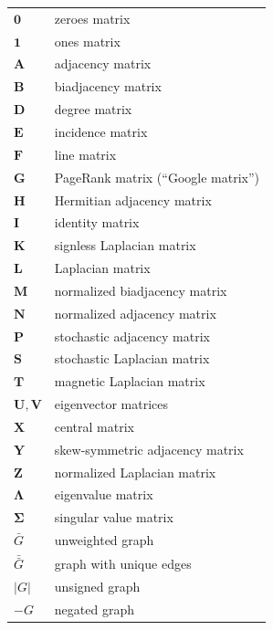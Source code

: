 \documentclass{article}
\begin{document}
\begin{longtable}{ll}
  $\mathbf 0$ & zeroes matrix \\
  $\mathbf 1$ & ones matrix \\
  $\mathbf A$ & adjacency matrix \\
  $\mathbf B$ & biadjacency matrix \\
  $\mathbf D$ & degree matrix \\
  $\mathbf E$ & incidence matrix \\ 
  $\mathbf F$ & line matrix \\
  $\mathbf G$ & PageRank matrix (``Google matrix'') \\
  $\mathbf H$ & Hermitian adjacency matrix \\
  $\mathbf I$ & identity matrix \\
  $\mathbf K$ & signless Laplacian matrix \\
  $\mathbf L$ & Laplacian matrix \\
  $\mathbf M$ & normalized biadjacency matrix \\
  $\mathbf N$ & normalized adjacency matrix \\
  $\mathbf P$ & stochastic adjacency matrix \\
  $\mathbf S$ & stochastic Laplacian matrix \\
  $\mathbf T$ & magnetic Laplacian matrix \\
  $\mathbf U, \mathbf V$ & eigenvector matrices \\
  $\mathbf X$ & central matrix \\
  $\mathbf Y$ & skew-symmetric adjacency matrix \\
  $\mathbf Z$ & normalized Laplacian matrix \\
  \midrule
  $\mathbf \Lambda$ & eigenvalue matrix \\
  $\mathbf \Sigma$ & singular value matrix \\
  \midrule
  $\bar G$ & unweighted graph \\
  $\bar{\bar G}$ & graph with unique edges \\
  $|G|$ & unsigned graph \\ 
  $-G$  & negated graph 
\end{longtable}
\end{document}
